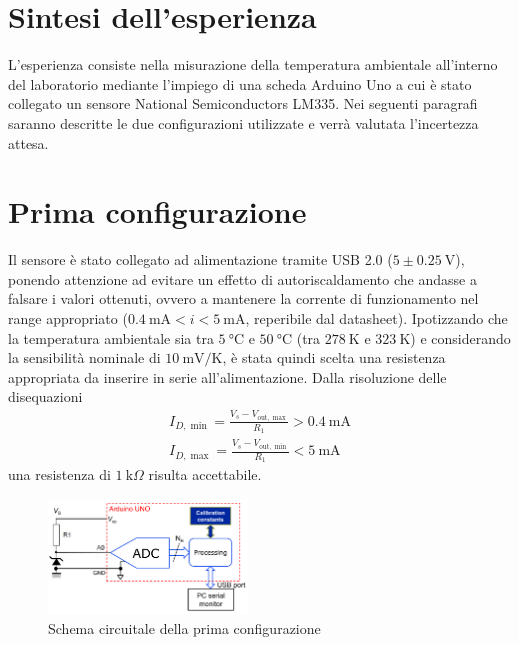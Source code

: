 \documentclass{article}
\begin{document}
\section{Sintesi dell'esperienza}
L'esperienza consiste nella misurazione della temperatura ambientale all'interno del laboratorio mediante l'impiego di una scheda Arduino Uno a cui è stato collegato un sensore National Semiconductors LM335. Nei seguenti paragrafi saranno descritte le due configurazioni utilizzate e verrà valutata l'incertezza attesa.

\section{Prima configurazione}
Il sensore è stato collegato ad alimentazione tramite USB 2.0 ($5 \pm \SI{0.25}{\volt}$), ponendo attenzione ad evitare un effetto di autoriscaldamento che andasse a falsare i valori ottenuti, ovvero a mantenere la corrente di funzionamento nel range appropriato ($\SI{0.4}{\milli\ampere}<i<\SI{5}{\milli\ampere}$, reperibile dal datasheet). 
Ipotizzando che la temperatura ambientale sia tra $\SI{5}{\celsius}$ e $\SI{50}{\celsius}$ (tra $\SI{278}{\kelvin}$ e $\SI{323}{\kelvin}$) e considerando la sensibilità nominale di $\SI{10}{\milli\volt\per\kelvin}$, è stata quindi scelta una resistenza appropriata da inserire in serie all'alimentazione. Dalla risoluzione delle disequazioni
\begin{align*}
    I_{D,\min}=\frac{V_s-V_{\text{out}, \max}}{R_1} > \SI{0.4}{\milli\ampere}\\
    I_{D,\max}=\frac{V_s-V_{\text{out}, \min}}{R_1} < \SI{5}{\milli\ampere}
\end{align*}
una resistenza di $\SI{1}{\kilo\Omega}$ risulta accettabile.
\begin{figure}[H]
    \centering\includegraphics[width=200px]{img/circuito_1.png}
    \caption{Schema circuitale della prima configurazione}
\end{figure}
\end{document}
